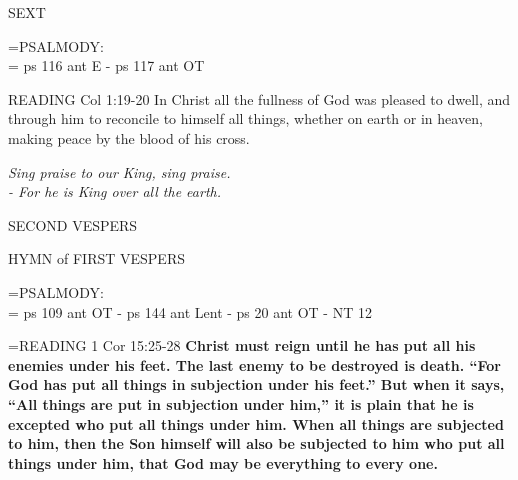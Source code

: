 \begin{flushleft}\normalsize SEXT\\\end{flushleft}

\hangindent=\parindent \small{PSALMODY:}\\
\hangindent=\parindent \vspace{0.5em}
ps 116 ant E - ps 117 ant OT

READING Col 1:19-20 In Christ all the fullness of God was pleased to dwell, and through him to reconcile to himself all things, whether on earth or in heaven, making peace by the blood of his cross.  

\begin{center}
\textit{Sing praise to our King, sing praise.\\
- For he is King over all the earth.}
\end{center}

\begin{flushleft}\normalsize SECOND VESPERS\\\end{flushleft}

\begin{flushleft}\normalsize HYMN of FIRST VESPERS\\\end{flushleft}

\hangindent=\parindent \small{PSALMODY:}\\
\hangindent=\parindent \vspace{0.5em}
ps 109 ant OT - ps 144 ant Lent - ps 20 ant OT - NT 12

\hangindent=\parindent \small{READING} 1 Cor 15:25-28 \textbf{Christ must reign until he has put all his enemies under his feet. The last enemy to be destroyed is death.  “For God has put all things in subjection under his feet.” But when it says, “All things are put in subjection under him,” it is plain that he is excepted who put all things under him. When all things are subjected to him, then the Son himself will also be subjected to him who put all things under him, that God may be everything to every one.  \\}
